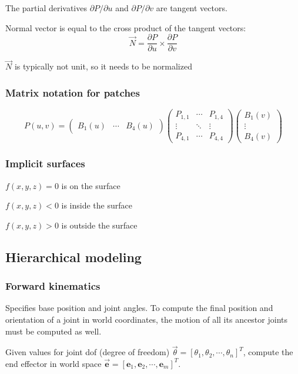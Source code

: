 \documentclass[12pt]{article}
\begin{document}
The partial derivatives $\partial P/\partial u$ and
$\partial P/\partial v$ are tangent vectors.

Normal vector is equal to the cross product of the tangent vectors:
\[ \vec N = \frac{\partial P}{\partial u} \times \frac{\partial P}
{\partial v} \]

$\vec N$ is typically not unit, so it needs to be normalized

\subsubsection{Matrix notation for patches}
\[
    P(u,v) =
    \begin{pmatrix}
        B_1(u) & \cdots & B_4(u)
    \end{pmatrix}
    \begin{pmatrix}
        P_{1,1} & \cdots & P_{1,4}\\
        \vdots & \ddots & \vdots\\
        P_{4,1} & \cdots & P_{4,4}
    \end{pmatrix}
    \begin{pmatrix}
        B_1(v)\\
        \vdots\\
        B_4(v)
    \end{pmatrix}
\]

\subsubsection{Implicit surfaces}

$f(x,y,z) = 0$ is on the surface

$f(x,y,z) < 0$ is inside the surface

$f(x,y,z) > 0$ is outside the surface

\subsection{Hierarchical modeling}

\subsubsection{Forward kinematics}

Specifies base position and joint angles. To compute the final position
and orientation of a joint in world coordinates, the motion of all its
ancestor joints must be computed as well.

Given values for joint dof (degree of freedom) $\vec \theta = [\theta_1,\theta_2,
\cdots,\theta_n]^T$, compute the end effector in world space $\vec{\bm e} =
[\bm e_1,\bm e_2,\cdots,\bm e_m]^T$.
\end{document}
